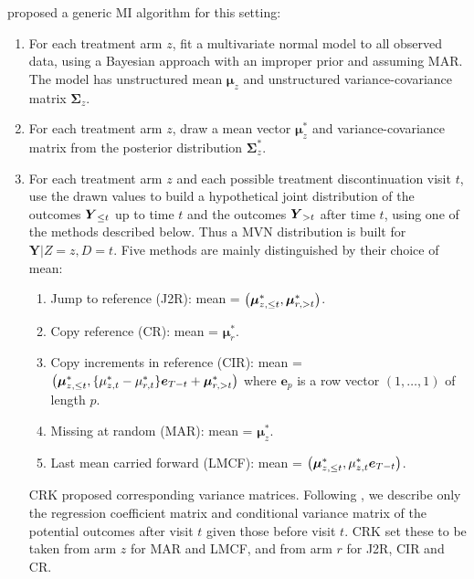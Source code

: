 \citet{Carpenter++13}  proposed a generic MI algorithm for this setting:
\begin{enumerate}

\item For each treatment arm $z$, fit a multivariate normal model to all observed data, using a
    Bayesian approach with an improper prior and assuming MAR. The model has unstructured
    mean $\boldsymbol{\mu}_z$ and unstructured variance-covariance matrix $\boldsymbol{\Sigma}_z$.

\item For each treatment arm $z$, draw a mean vector $\boldsymbol{\mu}_z^*$ and variance-covariance matrix from the
    posterior distribution $\boldsymbol{\Sigma}_z^*$.

\item For each treatment arm  $z$ and each possible treatment discontinuation visit $t$, use the drawn values to build a hypothetical  joint  distribution of 
the outcomes $\boldsymbol{Y}_{{\le{t}}}$ up to time $t$ 
and 
the outcomes $\boldsymbol{Y}_{{>t}}$ after time  $t$, 
using one of the methods described below.
Thus a MVN distribution is built for $\boldsymbol{Y}|Z=z,D=t$.
Five methods are mainly distinguished by their choice of mean: 
\begin{enumerate}
\item Jump to reference (J2R):
mean = $\left( \boldsymbol{\mu}_{z,{\le{t}}}^*, \boldsymbol{\mu}_{r,{>t}}^* \right)$.

\item Copy reference (CR):
mean = $\boldsymbol{\mu}_r^*$.

\item Copy increments in reference (CIR):
mean = $\left( \boldsymbol{\mu}_{z,{\le{t}}}^*,  \{\mu_{z,t}^* - \mu_{r,t}^* \} \boldsymbol{e}_{T-t} + \boldsymbol{\mu}_{r,{>t}}^*   \right)$
where $\boldsymbol{e}_p$ is a row vector $(1,\ldots,1)$ of length $p$.

\item Missing at random (MAR): mean = $\boldsymbol{\mu}_z^*$.

\item Last mean carried forward (LMCF):
mean = $\left( \boldsymbol{\mu}_{z,{\le{t}}}^*, \mu_{z,t}^*\boldsymbol{e}_{T-t} \right)$.
\end{enumerate}

CRK proposed corresponding variance matrices. Following \cite{ian:RBIcausal}, we describe only the regression coefficient matrix and conditional variance matrix of the potential outcomes after visit  $t$ given those before visit $t$. 
CRK set these to be taken from arm $z$ for MAR and LMCF, 
and from arm $r$ for J2R, CIR and CR. 


\end{enumerate}
